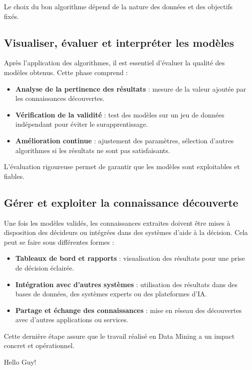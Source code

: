 \documentclass{article}
\begin{document}
         Le choix du bon algorithme dépend de la nature des données et des objectifs fixés.

     \subsection{Visualiser, évaluer et interpréter les modèles}
         Après l’application des algorithmes, il est essentiel d’évaluer la qualité des modèles obtenus. Cette phase comprend :
    
         \begin{itemize}
             \item \textbf{Analyse de la pertinence des résultats} : mesure de la valeur ajoutée par les connaissances découvertes.
        
             \item \textbf{Vérification de la validité} : test des modèles sur un jeu de données indépendant pour éviter le surapprentissage.
        
             \item \textbf{Amélioration continue} : ajustement des paramètres, sélection d’autres algorithmes si les résultats ne sont pas satisfaisants.
         \end{itemize}
    
         L’évaluation rigoureuse permet de garantir que les modèles sont exploitables et fiables.    

     \subsection{ Gérer et exploiter la connaissance découverte}
         Une fois les modèles validés, les connaissances extraites doivent être mises à disposition des décideurs ou intégrées dans des systèmes d’aide à la décision. Cela peut se faire sous différentes formes :

         \begin{itemize}
             \item \textbf{Tableaux de bord et rapports} : visualisation des résultats pour une prise de décision éclairée.
        
             \item \textbf{Intégration avec d’autres systèmes} : utilisation des résultats dans des bases de données, des systèmes experts ou des plateformes d’IA.
        
             \item \textbf{Partage et échange des connaissances} : mise en réseau des découvertes avec d’autres applications ou services.
         \end{itemize}
         Cette dernière étape assure que le travail réalisé en Data Mining a un impact concret et opérationnel.
     
Hello Guy!
\end{document}
